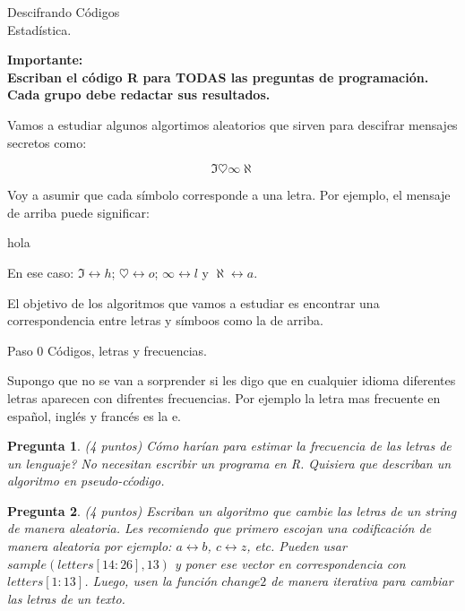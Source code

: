 \documentclass{article}
\newtheorem{pregunta}{Pregunta}
\def\die#1{{\domino#1}}
\newcommand{\skull}{\text{\usefont{U}{skulls}{m}{n}\symbol{'101}}}
\begin{document}
\begin{center}
  \Large Descifrando C\'odigos \\
  \null
  Estadística.
\end{center}
\vspace{1cm}

\textbf{Importante:\\
 Escriban el código R para TODAS las preguntas de programación. \\ Cada grupo debe redactar sus resultados.}

\null\hfill

 Vamos a estudiar algunos algortimos aleatorios que sirven para descifrar mensajes secretos como:

\begin{equation*}
\Im 	\heartsuit  \infty \aleph
\end{equation*}

Voy a asumir que cada s\'imbolo corresponde a una letra. Por ejemplo, el mensaje de arriba puede significar:

\begin{center}
  hola
\end{center}

En ese caso: $\Im \longleftrightarrow h$; $\heartsuit \longleftrightarrow o$; $\infty \longleftrightarrow l$ y $\aleph \longleftrightarrow a$.

El objetivo de los algoritmos que vamos a estudiar es encontrar una correspondencia entre letras y s\'imboos como la de arriba.

 \begin{topbot}
   \vspace{0.7em}
   Paso 0 \quad Códigos, letras y frecuencias.
   \vspace{0.7em}
 \end{topbot}
Supongo que no se van a sorprender si les digo que en cualquier idioma diferentes letras aparecen con difrentes frecuencias. Por ejemplo la letra mas frecuente en espa\~nol, ingl\'es y franc\'es es la e.

\begin{pregunta} (4 puntos)
C\'omo har\'ian para estimar la frecuencia de las letras de un lenguaje? No necesitan escribir un programa en R. Quisiera que describan un algoritmo en pseudo-c\'codigo.
\end{pregunta}

\begin{pregunta} (4 puntos)
Escriban un algoritmo que cambie las letras de un string de manera aleatoria. Les recomiendo que primero escojan una codificaci\'on de manera aleatoria por ejemplo: $a \leftrightarrow b$, $c \leftrightarrow z$, etc. Pueden usar $sample(letters[14:26], 13)$ y poner ese vector en correspondencia con $letters[1:13]$. Luego, usen la funci\'on $change2$ de manera iterativa para cambiar las letras de un texto.
\end{pregunta}
\end{document}

